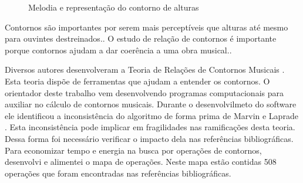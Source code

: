 \documentclass[11pt]{article}
\begin{document}
\begin{figure}[h]
  \centering
  \caption{Melodia e representação do contorno de alturas}
  \label{fig:melodia-representacao}
\end{figure}

Contornos são importantes por serem mais perceptíveis que alturas
até mesmo para ouvintes destreinados.\cite[p. 225]{Marvin1987}. O estudo
de relação de contornos é importante porque contornos ajudam a dar
coerência a uma obra musical.\cite[p. 225]{Clifford1995}.


Diversos autores desenvolveram a Teoria de Relações de Contornos
Musicais \cite{Friedmann1985, Friedmann1987, Morris1987, Marvin1987,
  Marvin1988, Polansky1992, Morris1993, Clifford1995, Quinn1997,
  Beard2003, Sampaio2008, Schultz2008, Schultz2009, Bor2009}. Esta
teoria dispõe de ferramentas que ajudam a entender os contornos.
O orientador deste trabalho vem desenvolvendo programas computacionais para
auxiliar no cálculo de contornos musicais.
Durante o desenvolvilmeto do software ele identificou a
inconsistência do algoritmo de forma prima de Marvin e Laprade
\cite{Marvin1987}. Esta inconsistência pode implicar em fragilidades
nas ramificações desta teoria.
Dessa forma foi necessário verificar o
impacto dela nas referências bibliográficas.
Para economizar tempo e energia na busca por operações de contornos,
desenvolvi e alimentei o mapa de operações.
Neste mapa estão contidas 508 operações que foram
encontradas nas referências bibliográficas.
\end{document}
